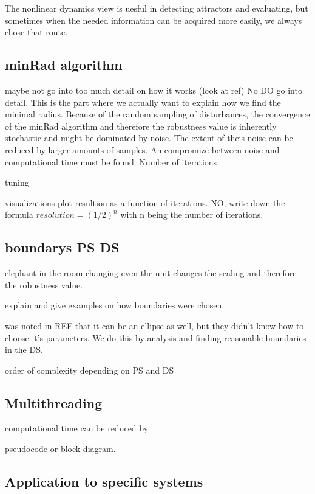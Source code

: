     The nonlinear dynamics view is uesful in detecting attractors and evaluating, but sometimes when the needed information can be acquired more easily, we always chose that route. 

\subsection{minRad algorithm}
    
    maybe not go into too much detail on how it works (look at ref)
    No DO go into detail. This is the part where we actually want to explain how we find the minimal radius. 
    Because of the random sampling of disturbances, the convergence of the minRad algorithm and therefore the robustness value is inherently stochastic and might be dominated by noise. The extent of theis noise can be reduced by larger amounts of samples. An compromize between noise and computational time must be found.
    Number of iterations
    
    tuning

    visualizations
    plot resultion as a function of iterations. NO, write down the formula $resolution = (1/2)^n$ with n being the number of iterations. 

\subsection{boundarys PS DS}

    

    elephant in the room 
    changing even the unit changes the scaling and therefore the robustness value.

    explain and give examples on how boundaries were chosen. 

    was noted in REF that it can be an ellipse as well, but they didn't know how to choose it's parameters. We do this by analysis and finding reasonable boundaries in the DS.

    order of complexity depending on PS and DS

\subsection{Multithreading}

    computational time can be reduced by 
    
    pseudocode or block diagram.

\subsection{Application to specific systems}
    

